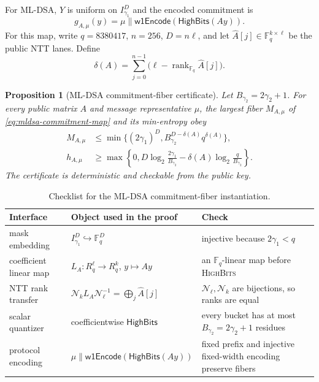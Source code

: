 \documentclass[pdflatex,sn-mathphys-num]{sn-jnl}
\theoremstyle{thmstyleone}
\newtheorem{proposition}[theorem]{Proposition}
\theoremstyle{thmstyletwo}
\newcommand{\rank}{\operatorname{rank}}
\newcommand{\HighBits}{\mathsf{HighBits}}
\newcommand{\woneEncode}{\mathsf{w1Encode}}
\begin{document}
For ML-DSA, $Y$ is uniform on $I_{\gamma_1}^{D}$ and the encoded commitment is
\begin{equation}
 g_{A,\mu}(y)=
 \mu\mathbin\|\woneEncode(\HighBits(Ay)).
 \label{eq:mldsa-commitment-map}
\end{equation}
For this map, write
$q=8380417$, $n=256$, $D=n\ell$, and let
$\widehat A[j]\in\mathbb F_q^{k\times\ell}$ be the public NTT lanes.  Define
\begin{equation}
 \delta(A)=\sum_{j=0}^{n-1}
 \bigl(\ell-\rank_{\mathbb F_q}\widehat A[j]\bigr).   \label{eq:mldsa-rank-defect}
\end{equation}

\begin{proposition}[ML-DSA commitment-fiber certificate]
\label{prop:mldsa-fiber}
Let $B_{\gamma_2}=2\gamma_2+1$.  For every public matrix $A$ and message
representative $\mu$, the largest fiber $M_{A,\mu}$ of
\eqref{eq:mldsa-commitment-map} and its min-entropy obey
\begin{align}
 M_{A,\mu}
 &\le\min\{(2\gamma_1)^D,
 B_{\gamma_2}^{D-\delta(A)}q^{\delta(A)}\},          \label{eq:mldsa-fiber-bound}\\
 h_{A,\mu}
 &\ge\max\left\{0,D\log_2\frac{2\gamma_1}{B_{\gamma_2}}
 -\delta(A)\log_2\frac q{B_{\gamma_2}}\right\}.    \label{eq:mldsa-entropy-bound}
\end{align}
The certificate is deterministic and checkable from the public key.
\end{proposition}

\begin{table}[ht]
\centering
\caption{Checklist for the ML-DSA commitment-fiber instantiation.}
\label{tab:mldsa-fiber-interfaces}
\small
\renewcommand{\arraystretch}{1.08}
\begin{tabularx}{\textwidth}{@{}>{\raggedright\arraybackslash}p{}p{}X@{}}
\toprule
Interface & Object used in the proof & Check \\
\midrule
mask embedding
 & $I_{\gamma_1}^{D}\hookrightarrow\mathbb F_q^D$
 & injective because $2\gamma_1<q$ \\
coefficient linear map
 & $L_A:R_q^\ell\to R_q^k$, $y\mapsto Ay$
 & an $\mathbb F_q$-linear map before \textsc{HighBits} \\
NTT rank transfer
 & $\mathcal N_kL_A\mathcal N_\ell^{-1}=\bigoplus_j\widehat A[j]$
 & $\mathcal N_\ell,\mathcal N_k$ are bijections, so ranks are equal \\
scalar quantizer
 & coefficientwise $\HighBits$
 & every bucket has at most $B_{\gamma_2}=2\gamma_2+1$ residues \\
protocol encoding
 & $\mu\|\woneEncode(\HighBits(Ay))$
 & fixed prefix and injective fixed-width encoding preserve fibers \\
\bottomrule
\end{tabularx}
\end{table}
\end{document}
